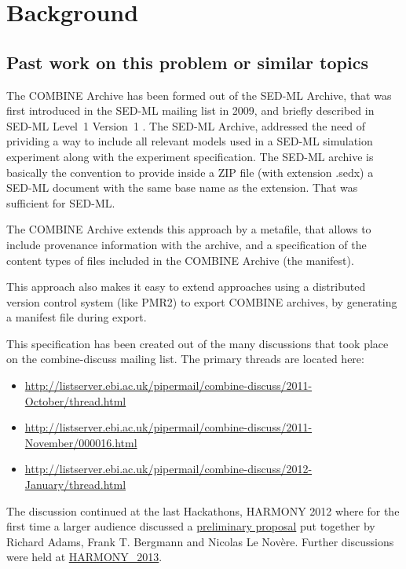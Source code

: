 
\section{Background}
\label{background}

\subsection{Past work on this problem or similar topics}
The COMBINE Archive has been formed out of the SED-ML Archive, that was 
first introduced in the SED-ML mailing list in 2009, and briefly described
in SED-ML Level~1 Version~1 \cite{sedmll1v1}. The SED-ML Archive, addressed the need of 
prividing a way to include all relevant models used in a SED-ML simulation
experiment along with the experiment specification. The SED-ML archive is 
basically the convention to provide inside a ZIP file (with extension .sedx)
a SED-ML document with the same base name as the extension. That was sufficient 
for SED-ML. 

The COMBINE Archive extends this approach by a metafile, that allows to include 
provenance information with the archive, and a specification of the content types
of files included in the COMBINE Archive (the manifest). 

This approach also makes it easy to extend approaches using a distributed version 
control system (like PMR2) to export COMBINE archives, by generating a manifest file
during export. 

This specification has been created out of the many discussions that took place
on the combine-discuss mailing list. The primary threads are located here: 

\begin{itemize}
	\item \href{http://listserver.ebi.ac.uk/pipermail/combine-discuss/2011-October/thread.html}{http://listserver.ebi.ac.uk/pipermail/combine-discuss/2011-October/thread.html}
	\item \href{http://listserver.ebi.ac.uk/pipermail/combine-discuss/2011-November/000016.html}{http://listserver.ebi.ac.uk/pipermail/combine-discuss/2011-November/000016.html}
	\item \href{http://listserver.ebi.ac.uk/pipermail/combine-discuss/2012-January/thread.html}{http://listserver.ebi.ac.uk/pipermail/combine-discuss/2012-January/thread.html}
\end{itemize}

The discussion continued at the last Hackathons, HARMONY 2012 where
for the first time a larger audience discussed a \href{https://docs.google.com/document/d/10tI1NwehBVDTxE5Q11APx7bZVoeNVJdFMiBdPywZKZM/edit}{preliminary proposal} put together by Richard Adams, Frank T. Bergmann and Nicolas Le Nov\`{e}re.  
Further discussions were held at \href{https://docs.google.com/document/d/1ji2mOiWzXXl9ON6sU6Svd3E_IufowUCz24hklqci0iM/edit}{HARMONY\_2013}. 
